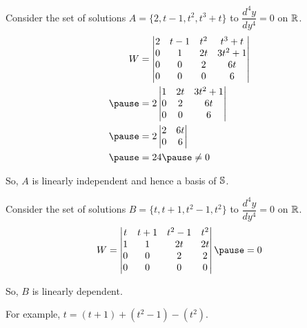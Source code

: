 \documentclass{beamer}
\begin{document}
\begin{frame}
\begin{example}
Consider the set of solutions $A=\{2,t-1,t^2,t^3+t\}$ to $\dfrac{d^4y}{dy^4}=0$ on $\mathbb{R}$.\pause
\begin{equation*}
\begin{aligned}
W &=
\begin{vmatrix}
2 & t-1 & t^2 & t^3+t  \\
0 & 1   & 2t  & 3t^2+1 \\
0 & 0   & 2   & 6t     \\
0 & 0   & 0   & 6      \\
\end{vmatrix}\\\pause
&=2
\begin{vmatrix}
1   & 2t  & 3t^2+1 \\
0   & 2   & 6t     \\
0   & 0   & 6      \\
\end{vmatrix}\\\pause
&=2
\begin{vmatrix}
2   & 6t     \\
0   & 6      \\
\end{vmatrix}\\\pause
&=24\pause
\neq0
\end{aligned}
\end{equation*}

\vspace{-3mm}
So, $A$ is linearly independent and hence a basis of $\mathbb{S}$.
\end{example}
\end{frame}

\begin{frame}
\begin{example}
Consider the set of solutions $B=\{t,t+1,t^2-1,t^2\}$ to $\dfrac{d^4y}{dy^4}=0$ on $\mathbb{R}$.\pause
\begin{equation*}
W =
\begin{vmatrix}
t & t+1 & t^2 -1 & t^2  \\
1 & 1   & 2t     & 2t   \\
0 & 0   & 2      & 2    \\
0 & 0   & 0      & 0    \\
\end{vmatrix}\pause
=0
\end{equation*}

\vspace{-3mm}
So, $B$ is linearly dependent.\pause

\vspace{2mm}
For example, $t=(t+1)+(t^2-1)-(t^2)$.
\end{example}
\end{frame}
\end{document}
